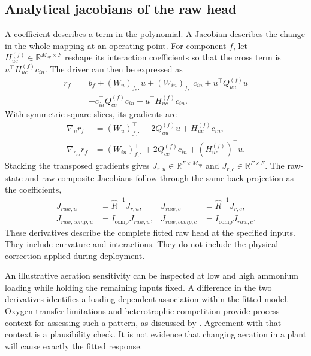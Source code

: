 \subsection{Analytical jacobians of the raw head}

A coefficient describes a term in the polynomial. A Jacobian describes the change in the whole mapping at an operating point. For component \(f\), let \(H_{uc}^{(f)}\in\mathbb{R}^{M_{op}\times F}\) reshape its interaction coefficients so that the cross term is \(u^\top H_{uc}^{(f)}c_{in}\). The driver can then be expressed as
\begin{equation}
\label{eq:icsor_driver_component}
\begin{aligned}
r_f={}&b_f+(W_u)_{f,:}u+(W_{in})_{f,:}c_{in}
+u^\top Q_{uu}^{(f)}u\\
&+c_{in}^\top Q_{cc}^{(f)}c_{in}
+u^\top H_{uc}^{(f)}c_{in}.
\end{aligned}
\end{equation}
With symmetric square slices, its gradients are
\begin{equation}
\label{eq:icsor_driver_gradients}
\begin{aligned}
\nabla_u r_f&=(W_u)_{f,:}^\top+2Q_{uu}^{(f)}u
+H_{uc}^{(f)}c_{in},\\
\nabla_{c_{in}}r_f&=(W_{in})_{f,:}^\top+2Q_{cc}^{(f)}c_{in}
+(H_{uc}^{(f)})^\top u.
\end{aligned}
\end{equation}
Stacking the transposed gradients gives \(J_{r,u}\in\mathbb{R}^{F\times M_{op}}\) and \(J_{r,c}\in\mathbb{R}^{F\times F}\). The raw-state and raw-composite Jacobians follow through the same back projection as the coefficients,
\begin{equation}
\label{eq:icsor_raw_jacobians}
\begin{aligned}
J_{raw,u}&=\widehat R^{-1}J_{r,u},
&J_{raw,c}&=\widehat R^{-1}J_{r,c},\\
J_{raw,comp,u}&=I_{\mathrm{comp}}J_{raw,u},
&J_{raw,comp,c}&=I_{\mathrm{comp}}J_{raw,c}.
\end{aligned}
\end{equation}
These derivatives describe the complete fitted raw head at the specified inputs. They include curvature and interactions. They do not include the physical correction applied during deployment.

An illustrative aeration sensitivity can be inspected at low and high ammonium loading while holding the remaining inputs fixed. A difference in the two derivatives identifies a loading-dependent association within the fitted model. Oxygen-transfer limitations and heterotrophic competition provide process context for assessing such a pattern, as discussed by \citet{StenstromSong1991}. Agreement with that context is a plausibility check. It is not evidence that changing aeration in a plant will cause exactly the fitted response.

